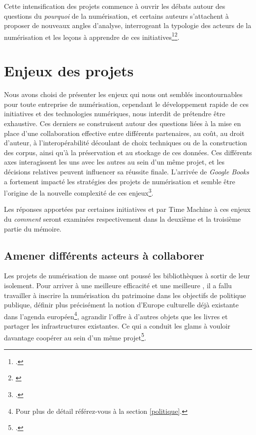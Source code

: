 Cette intensification des projets commence à ouvrir les débats autour des questions du \textit{pourquoi} de la numérisation, et certains auteurs s'attachent à proposer de nouveaux angles d'analyse, interrogeant la typologie des acteurs de la numérisation et les leçons à apprendre de ces initiatives\footcite[p.47]{lampert_ramping_2018}\footnote{\cite{thylstrup_politics_2018}}.

\section{Enjeux des projets}
Nous avons choisi de présenter les enjeux qui nous ont semblés incontournables pour toute entreprise de numérisation, cependant le développement rapide de ces initiatives et des technologies numériques, nous interdit de prétendre être exhaustive. Ces derniers se construisent autour des questions liées à la mise en place d'une collaboration effective entre différents partenaires, au coût, au droit d'auteur, à l'interopérabilité découlant de choix techniques ou de la construction des corpus, ainsi qu'à la préservation et au stockage de ces données. Ces différents axes interagissent les uns avec les autres au sein d'un même projet, et les décisions relatives peuvent influencer sa réussite finale. 
L'arrivée de \textit{Google Books} a fortement impacté les stratégies des projets de numérisation et semble être l'origine de la nouvelle complexité de ces enjeux\footcite{dufrene_numerisation_2013}.

Les réponses apportées par certaines initiatives et par Time Machine à ces enjeux du \textit{comment} seront examinées respectivement dans la deuxième et la troisième partie du mémoire.
\subsection{Amener différents acteurs à collaborer }
Les projets de numérisation de masse ont poussé les bibliothèques à sortir de leur isolement. Pour arriver à une meilleure efficacité et une meilleure , il a fallu travailler à inscrire la numérisation du patrimoine dans les objectifs de politique publique, définir plus précisément la notion d'Europe culturelle déjà existante dans l'agenda européen\footnote{Pour plus de détail référez-vous à la section \ref{politique}.}, agrandir l'offre à d'autres objets que les livres et partager les infrastructures existantes. Ce qui a conduit les \gls{glam}s à vouloir davantage coopérer au sein d'un même projet\footcite{dufrene_numerisation_2013}. 

